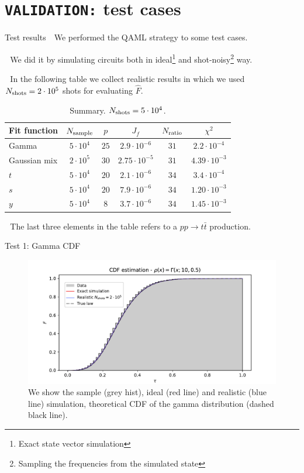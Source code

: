 \documentclass[8pt, xcolor={svgnames}, hyperref={colorlinks, linkcolor=black, citecolor=amethyst, urlcolor=amethyst}]{beamer}
\begin{document}
\section{\texttt{VALIDATION:} test cases}

\begin{frame}{Test results}
\large 
\faArrowCircleRight\,\, We performed the QAML strategy to some test cases.
\pause 

\faArrowCircleRight\,\, We did it by simulating circuits both in ideal\footnote<2->{Exact
state vector simulation} and shot-noisy\footnote<2->{Sampling the frequencies from the
simulated state} way. 
\pause 

\faArrowCircleRight\,\, In the following table we collect realistic results in which we used 
$N_{\rm shots}=2\cdot 10^{5}$ shots for evaluating $\hat{F}$.
\begin{table}
  \begin{tabular}{lccccc}
  \hline \hline
    Fit function & $N_{\rm sample}$ & $p$ & $J_f$ & $N_{\rm ratio}$ & $\chi^2$\\
  \hline
    Gamma & $5 \cdot 10^4$ & $25$ & $2.9 \cdot 10^{-6}$ & $31$ & $2.2\cdot10^{-4}$ \\
    Gaussian mix & $2 \cdot 10^5$ & $30$ & $2.75 \cdot 10^{-5}$ & $31$ & $4.39 \cdot 10^{-3}$ \\
    $t$ & $5\cdot 10^4$ & $20$ & $2.1 \cdot 10^{-6}$ & $34$ & $3.4 \cdot 10^{-4}$ \\
    $s$ & $5\cdot 10^4$ & $20$ & $7.9 \cdot 10^{-6}$ & $34$ & $1.20 \cdot 10^{-3}$\\
    $y$ & $5\cdot 10^4$ & $8$ & $3.7 \cdot 10^{-6}$ & $34$ & $1.45 \cdot 10^{-3}$\\
  \hline \hline
  \end{tabular}
  \caption{\label{tab:summary}Summary. $N_{\rm shots} = 5 \cdot 10^4$.}
  \end{table}
\pause 
\faArrowCircleRight\,\, The last three elements in the table refers to a $pp\to t\bar{t}$
production.
\end{frame}

\begin{frame}[fragile]{Test 1: Gamma CDF}
\begin{figure}
  \centering
  \includegraphics[width=1\linewidth]{figures/CDF_Gamma_25_20_200000.pdf}
  \caption{We show the sample (grey hist), ideal (red line) and realistic 
  (blue line) simulation, theoretical CDF of the gamma distribution (dashed black
  line).}
\end{figure}
\end{frame}
\end{document}
